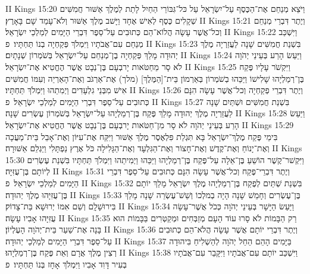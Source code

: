 II Kings 15:20	וַיֹּצֵא מְנַחֵם אֶת־הַכֶּסֶף עַל־יִשְׂרָאֵל עַל כּל־גִּבּוֹרֵי הַחַיִל לָתֵת לְמֶלֶךְ אַשּׁוּר חֲמִשִּׁים שְׁקָלִים כֶּסֶף לְאִישׁ אֶחָד וַיָּשׁב מֶלֶךְ אַשּׁוּר וְלֹא־עָמַד שָׁם בָּאָרֶץ׃
II Kings 15:21	וְיֶתֶר דִּבְרֵי מְנַחֵם וְכל־אֲשֶׁר עָשָׂה הֲלוֹא־הֵם כְּתוּבִים עַל־סֵפֶר דִּבְרֵי הַיָּמִים לְמַלְכֵי יִשְׂרָאֵל׃
II Kings 15:22	וַיִּשְׁכַּב מְנַחֵם עִם־אֲבֹתָיו וַיִּמְלֹךְ פְּקַחְיָה בְנוֹ תַּחְתָּיו׃ {פ}
II Kings 15:23	בִּשְׁנַת חֲמִשִּׁים שָׁנָה לַעֲזַרְיָה מֶלֶךְ יְהוּדָה מָלַךְ פְּקַחְיָה בֶן־מְנַחֵם עַל־יִשְׂרָאֵל בְּשֹׁמְרוֹן שְׁנָתָיִם׃
II Kings 15:24	וַיַּעַשׂ הָרַע בְּעֵינֵי יְהֹוָה לֹא סָר מֵחַטֹּאות יָרבְעָם בֶּן־נְבָט אֲשֶׁר הֶחֱטִיא אֶת־יִשְׂרָאֵל׃
II Kings 15:25	וַיִּקְשֹׁר עָלָיו פֶּקַח בֶּן־רְמַלְיָהוּ שָׁלִישׁוֹ וַיַּכֵּהוּ בְשֹׁמְרוֹן בְּאַרְמוֹן בֵּית־[הַמֶּלֶךְ] (מלך) אֶת־אַרְגֹּב וְאֶת־הָאַרְיֵה וְעִמּוֹ חֲמִשִּׁים אִישׁ מִבְּנֵי גִלְעָדִים וַיְמִתֵהוּ וַיִּמְלֹךְ תַּחְתָּיו׃
II Kings 15:26	וְיֶתֶר דִּבְרֵי פְקַחְיָה וְכל־אֲשֶׁר עָשָׂה הִנָּם כְּתוּבִים עַל־סֵפֶר דִּבְרֵי הַיָּמִים לְמַלְכֵי יִשְׂרָאֵל׃ {פ}
II Kings 15:27	בִּשְׁנַת חֲמִשִּׁים וּשְׁתַּיִם שָׁנָה לַעֲזַרְיָה מֶלֶךְ יְהוּדָה מָלַךְ פֶּקַח בֶּן־רְמַלְיָהוּ עַל־יִשְׂרָאֵל בְּשֹׁמְרוֹן עֶשְׂרִים שָׁנָה׃
II Kings 15:28	וַיַּעַשׂ הָרַע בְּעֵינֵי יְהֹוָה לֹא סָר מִן־חַטֹּאות יָרבְעָם בֶּן־נְבָט אֲשֶׁר הֶחֱטִיא אֶת־יִשְׂרָאֵל׃
II Kings 15:29	בִּימֵי פֶּקַח מֶלֶךְ־יִשְׂרָאֵל בָּא תִּגְלַת פִּלְאֶסֶר מֶלֶךְ אַשּׁוּר וַיִּקַּח אֶת־עִיּוֹן וְאֶת־אָבֵל בֵּית־מַעֲכָה וְאֶת־יָנוֹחַ וְאֶת־קֶדֶשׁ וְאֶת־חָצוֹר וְאֶת־הַגִּלְעָד וְאֶת־הַגָּלִילָה כֹּל אֶרֶץ נַפְתָּלִי וַיַּגְלֵם אַשּׁוּרָה׃
II Kings 15:30	וַיִּקְשׁר־קֶשֶׁר הוֹשֵׁעַ בֶּן־אֵלָה עַל־פֶּקַח בֶּן־רְמַלְיָהוּ וַיַּכֵּהוּ וַיְמִיתֵהוּ וַיִּמְלֹךְ תַּחְתָּיו בִּשְׁנַת עֶשְׂרִים לְיוֹתָם בֶּן־עֻזִּיָּה׃
II Kings 15:31	וְיֶתֶר דִּבְרֵי־פֶקַח וְכל־אֲשֶׁר עָשָׂה הִנָּם כְּתוּבִים עַל־סֵפֶר דִּבְרֵי הַיָּמִים לְמַלְכֵי יִשְׂרָאֵל׃ {פ}
II Kings 15:32	בִּשְׁנַת שְׁתַּיִם לְפֶקַח בֶּן־רְמַלְיָהוּ מֶלֶךְ יִשְׂרָאֵל מָלַךְ יוֹתָם בֶּן־עֻזִּיָּהוּ מֶלֶךְ יְהוּדָה׃
II Kings 15:33	בֶּן־עֶשְׂרִים וְחָמֵשׁ שָׁנָה הָיָה בְמלְכוֹ וְשֵׁשׁ־עֶשְׂרֵה שָׁנָה מָלַךְ בִּירוּשָׁלָ͏ִם וְשֵׁם אִמּוֹ יְרוּשָׁא בַּת־צָדוֹק׃
II Kings 15:34	וַיַּעַשׂ הַיָּשָׁר בְּעֵינֵי יְהֹוָה כְּכֹל אֲשֶׁר־עָשָׂה עֻזִּיָּהוּ אָבִיו עָשָׂה׃
II Kings 15:35	רַק הַבָּמוֹת לֹא סָרוּ עוֹד הָעָם מְזַבְּחִים וּמְקַטְּרִים בַּבָּמוֹת הוּא בָּנָה אֶת־שַׁעַר בֵּית־יְהֹוָה הָעֶלְיוֹן׃
II Kings 15:36	וְיֶתֶר דִּבְרֵי יוֹתָם אֲשֶׁר עָשָׂה הֲלֹא־הֵם כְּתוּבִים עַל־סֵפֶר דִּבְרֵי הַיָּמִים לְמַלְכֵי יְהוּדָה׃
II Kings 15:37	בַּיָּמִים הָהֵם הֵחֵל יְהֹוָה לְהַשְׁלִיחַ בִּיהוּדָה רְצִין מֶלֶךְ אֲרָם וְאֵת פֶּקַח בֶּן־רְמַלְיָהוּ׃
II Kings 15:38	וַיִּשְׁכַּב יוֹתָם עִם־אֲבֹתָיו וַיִּקָּבֵר עִם־אֲבֹתָיו בְּעִיר דָּוִד אָבִיו וַיִּמְלֹךְ אָחָז בְּנוֹ תַּחְתָּיו׃ {פ}
